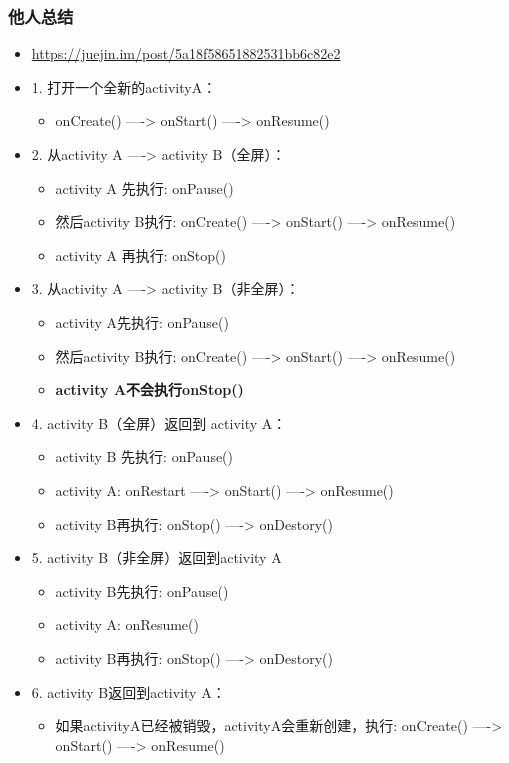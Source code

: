 \documentclass[9pt, b5paper]{article}
\begin{document}
\subsubsection{他人总结}
\label{sec-1-1-2}
\begin{itemize}
\item \url{https://juejin.im/post/5a18f58651882531bb6c82e2}
\item 1. 打开一个全新的activityA：
\begin{itemize}
\item onCreate() ----> onStart() ----> onResume()
\end{itemize}
\item 2. 从activity A ----> activity B（全屏）：
\begin{itemize}
\item activity A 先执行: onPause()
\item 然后activity B执行: onCreate() ----> onStart() ----> onResume()
\item activity A 再执行: onStop()
\end{itemize}
\item 3. 从activity A ----> activity B（非全屏）：
\begin{itemize}
\item activity A先执行: onPause()
\item 然后activity B执行: onCreate() ----> onStart() ----> onResume()
\item \textbf{activity A不会执行onStop()}
\end{itemize}
\item 4. activity B（全屏）返回到 activity A：
\begin{itemize}
\item activity B 先执行: onPause()
\item activity A: onRestart ----> onStart() ----> onResume()
\item activity B再执行: onStop() ----> onDestory()
\end{itemize}
\item 5. activity B（非全屏）返回到activity A 
\begin{itemize}
\item activity B先执行: onPause()
\item activity A: onResume()
\item activity B再执行: onStop() ----> onDestory()
\end{itemize}
\item 6. activity B返回到activity A：
\begin{itemize}
\item 如果activityA已经被销毁，activityA会重新创建，执行: onCreate() ----> onStart() ----> onResume()

\end{itemize}
\end{itemize}
\end{document}
